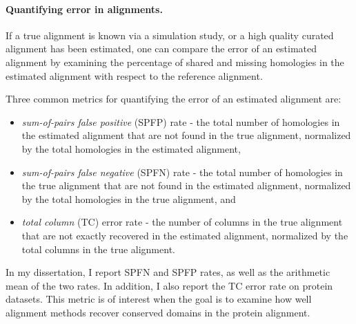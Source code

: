 \paragraph{Quantifying error in alignments.}  If a true alignment is known via a simulation study, or a high quality curated alignment has been estimated, one can compare the error of an estimated alignment by examining the percentage of shared and missing homologies in the estimated alignment with respect to the reference alignment.

Three common metrics for quantifying the error of an estimated alignment are:
\begin{itemize}
\item \emph{sum-of-pairs false positive} (SPFP) rate - the total number of homologies in the estimated alignment that are not found in the true alignment, normalized by the total homologies in the estimated alignment,
\item \emph{sum-of-pairs false negative} (SPFN) rate - the total number of homologies in the true alignment that are not found in the estimated alignment, normalized by the total homologies in the true alignment, and
\item \emph{total column} (TC) error rate - the number of columns in the true alignment that are not exactly recovered in the estimated alignment, normalized by the total columns in the true alignment.
\end{itemize}

In my dissertation, I report SPFN and SPFP rates, as well as the arithmetic mean of the two rates.  In addition, I also report the TC error rate on protein datasets.  This metric is of interest when the goal is to examine how well alignment methods recover conserved domains in the protein alignment.




